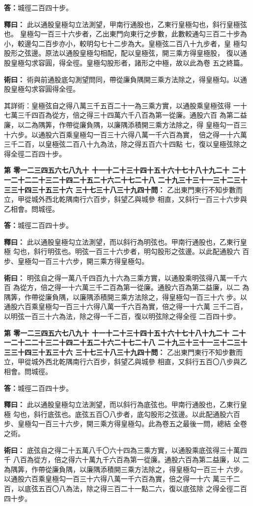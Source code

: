 \documentclass[11pt,a4paper]{article}
\newcounter{probnum}
\newcommand{\chnum}[1]{%
  \ifcase#1 零\or 一\or 二\or 三\or 四\or 五\or 六\or 七\or 八\or 九\or 十\or
    十一\or 十二\or 十三\or 十四\or 十五\or 十六\or 十七\or 十八\or 十九\or 二十\or
    二十一\or 二十二\or 二十三\or 二十四\or 二十五\or 二十六\or 二十七\or 二十八\or
    二十九\or 三十\or 三十一\or 三十二\or 三十三\or 三十四\or 三十五\or 三十六\or
    三十七\or 三十八\or 三十九\or 四十\fi}
\newcommand{\problem}[1]{\stepcounter{probnum}\par\noindent\textbf{第\chnum{\value{probnum}}問：}#1\par}
\newcommand{\answer}[1]{\par\noindent\textbf{答：}#1\par}
\newcommand{\shiyi}[1]{\par\noindent\textbf{釋曰：}#1\par}
\newcommand{\shuyue}[1]{\par\noindent\textbf{術曰：}#1\par}
\begin{document}
\answer{城徑二百四十步。}

\shiyi{
此以通股皇極勾立法測望，甲南行通股也，乙東行皇極勾也，斜行皇極弦也。
皇極勾一百三十六步者，乙出東門向東行之步數，此數較通勾三百二十步為
小，較邊勾二百步亦小，較明勾七十二步為大。皇極弦二百八十九步者，皇
極勾股形之弦邊。原法以通股皇極勾相配，配以皇極弦，開三乘方得皇極股，
復以通股皇極勾求容圓，得全徑。皇極勾股形者，諸形之中極，故以此為卷
五之終篇。
}

\shuyue{
術與前通股底勾測望問同，帶從廉負隅開三乘方法除之，得皇極勾。以通
股皇極勾求容圓得全徑。

其詳術：皇極弦自之得八萬三千五百二十一為三乘方實，以通股乘皇極弦得
一十七萬三千四百為從方，倍之得三十四萬六千八百為第一從廉。通股六百
為第二益廉，以二為隅筭，作帶從廉負隅，以廉隅添積開三乘方法除之，得
皇極勾一百三十六步。以通股六百乘皇極勾一百三十六得八萬一千六百為實，
倍之得一十六萬三千二百，以皇極弦二百八十九為法，除之得五百六十四點
七，復以皇極弦除之得全徑二百四十步。
}

\vspace{0.3cm}
\problem{
乙出東門東行不知步數而立，甲從城外西北乾隅南行六百步，斜望乙與城參
相直，又斜行一百三十六步與乙相會。問城徑。
}

\answer{城徑二百四十步。}

\shiyi{
此以通股皇極勾立法測望，而以斜行為明弦也。甲南行通股也，乙東行皇極
勾也，斜行明弦也。明弦一百三十六步者，明勾股形之弦邊。以此配通股六
百步、皇極勾一百三十六步，開三乘方得皇極勾。
}

\shuyue{
明弦自之得一萬八千四百九十六為三乘方實，以通股乘明弦得八萬一千六百
為從方，倍之得一十六萬三千二百為第一從廉。通股六百為第二益廉，以二
為隅筭，作帶從廉負隅，以廉隅添積開三乘方法除之，得皇極勾一百三十六
步。以通股六百乘皇極勾一百三十六得八萬一千六百為實，倍之得一十六萬
三千二百，以明弦一百三十六為法，除之得一千二百，復以明弦除之得全徑
二百四十步。
}

\vspace{0.3cm}
\problem{
乙出東門東行不知步數而立，甲從城外西北乾隅南行六百步，斜望乙與城參
相直，又斜行五百〇八步與乙相會。問城徑。
}

\answer{城徑二百四十步。}

\shiyi{
此以通股皇極勾立法測望，而以斜行為底弦也。甲南行通股也，乙東行皇極
勾也，斜行底弦也。底弦五百〇八步者，底勾股形之弦邊。以此配通股六百
步、皇極勾一百三十六步，開三乘方得皇極勾。此為卷五之最後一問，總結
全卷之術。
}

\shuyue{
底弦自之得二十五萬八千〇六十四為三乘方實，以通股乘底弦得三十萬四千
八百為從方，倍之得六十萬九千六百為第一從廉。通股六百為第二益廉，以
二為隅筭，作帶從廉負隅，以廉隅添積開三乘方法除之，得皇極勾一百三十
六步。以通股六百乘皇極勾一百三十六得八萬一千六百為實，倍之得一十六
萬三千二百，以底弦五百〇八為法，除之得三百二十一點二六，復以底弦除
之得全徑二百四十步。
}
\end{document}
